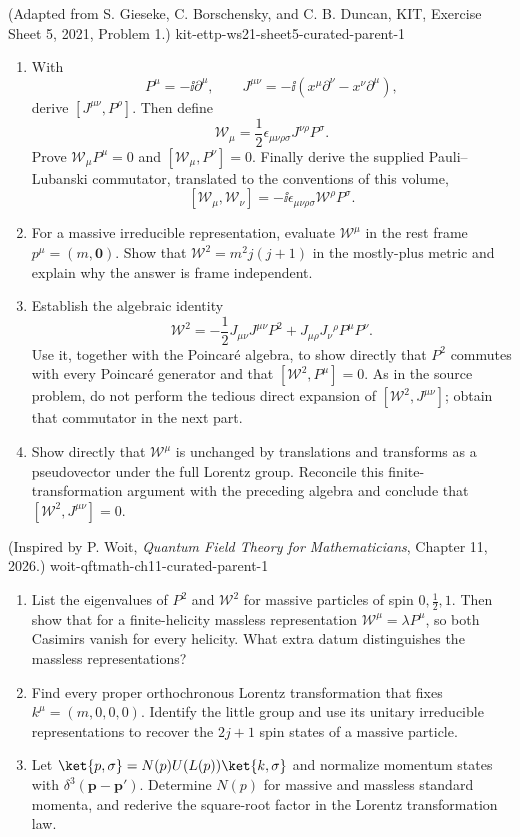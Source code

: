 \begin{enumerate}
  {(Adapted from S. Gieseke, C. Borschensky, and C. B. Duncan, KIT, Exercise Sheet 5, 2021, Problem 1.)}
  {kit-ettp-ws21-sheet5-curated-parent-1}
\begin{enumerate}
\item
With
\[
 P^\mu=-\ii\partial^\mu,\qquad
 J^{\mu\nu}=-\ii(x^\mu\partial^\nu-x^\nu\partial^\mu),
\]
derive \([J^{\mu\nu},P^\rho]\).  Then define
\[
 \mathcal W_\mu=\frac12\epsilon_{\mu\nu\rho\sigma}
 J^{\nu\rho}P^\sigma.
\]
Prove \(\mathcal W_\mu P^\mu=0\) and
\([\mathcal W_\mu,P^\nu]=0\).  Finally derive the supplied
Pauli--Lubanski commutator, translated to the conventions of this volume,
\[
 [\mathcal W_\mu,\mathcal W_\nu]
 =-\ii\epsilon_{\mu\nu\rho\sigma}\mathcal W^\rho P^\sigma .
\]
\item
For a massive irreducible representation, evaluate \(\mathcal W^\mu\) in
the rest frame \(p^\mu=(m,\mathbf0)\).  Show that
\(\mathcal W^2=m^2j(j+1)\) in the mostly-plus metric and explain why the
answer is frame independent.
\item
Establish the algebraic identity
\[
 \mathcal W^2
 =-\frac12J_{\mu\nu}J^{\mu\nu}P^2
  +J_{\mu\rho}J_\nu{}^\rho P^\mu P^\nu .
\]
Use it, together with the Poincar\'e algebra, to show directly that
\(P^2\) commutes with every Poincar\'e generator and that
\([\mathcal W^2,P^\mu]=0\).  As in the source problem, do not perform the
tedious direct expansion of
\([\mathcal W^2,J^{\mu\nu}]\); obtain that commutator in the next part.
\item
Show directly that \(\mathcal W^\mu\) is unchanged by translations and
transforms as a pseudovector under the full Lorentz group.  Reconcile this
finite-transformation argument with the preceding algebra and conclude
that \([\mathcal W^2,J^{\mu\nu}]=0\).
\end{enumerate}

  {(Inspired by P. Woit, \emph{Quantum Field Theory for Mathematicians}, Chapter 11, 2026.)}
  {woit-qftmath-ch11-curated-parent-1}
\begin{enumerate}
\item
List the eigenvalues of \(P^2\) and \(\mathcal W^2\) for massive particles
of spin \(0,\frac12,1\).  Then show that for a finite-helicity massless
representation \(\mathcal W^\mu=\lambda P^\mu\), so both Casimirs vanish
for every helicity.  What extra datum distinguishes the massless
representations?
\item
Find every proper orthochronous Lorentz transformation that fixes
\(k^\mu=(m,0,0,0)\).  Identify the little group and use its unitary
irreducible representations to recover the \(2j+1\) spin states of a
massive particle.
\item
Let \(\ket{p,\sigma}=N(p)U(L(p))\ket{k,\sigma}\) and normalize momentum
states with \(\delta^3(\mathbf p-\mathbf p')\).  Determine \(N(p)\) for
massive and massless standard momenta, and rederive the square-root factor
in the Lorentz transformation law.
\end{enumerate}


\end{enumerate}
